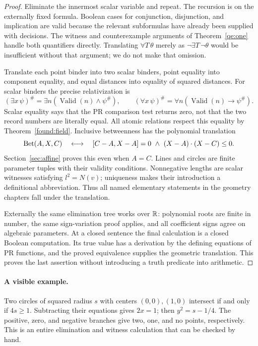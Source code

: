 \begin{proof}
Eliminate the innermost scalar variable and repeat. The recursion is on
the externally fixed formula. Boolean cases for conjunction, disjunction,
and implication are valid because the relevant subformulas have already
been supplied with decisions. The witness and counterexample arguments
of Theorem~\ref{qe:one} handle both quantifiers directly. Translating
$\forall T\,\theta$ merely as $\neg\exists T\,\neg\theta$ would
be insufficient without that argument; we do not make that omission.

Translate each point binder into two scalar binders, point equality into
component equality, and equal distances into equality of squared distances.
For scalar binders the precise relativization is
\[
 (\exists x\,\psi)^\#=\exists n(\operatorname{Valid}(n)\land\psi^\#),
 \qquad
 (\forall x\,\psi)^\#=\forall n(\operatorname{Valid}(n)\to\psi^\#).
\]
Scalar equality says that the PR comparison test returns zero, not that
the two record numbers are literally equal. All atomic relations respect
this equality by Theorem~\ref{found:field}.
Inclusive betweenness has the polynomial translation
\begin{equation}\label{eq:betweenpoly}
 \operatorname{Bet}(A,X,C)\quad\longleftrightarrow\quad
 [C-A,X-A]=0\ \land\ (X-A)\mathbin\cdot(X-C)\le0.
\end{equation}
Section~\ref{sec:affine} proves this even when $A=C$. Lines and circles
are finite parameter tuples with their validity conditions. Nonnegative
lengths are scalar witnesses satisfying $l^2=N(v)$; uniqueness makes
their introduction a definitional abbreviation. Thus all named elementary
statements in the geometry chapters fall under the translation.

Externally the same elimination tree works over $\mathbb R$: polynomial roots
are finite in number, the same sign-variation proof applies, and all
coefficient signs agree on algebraic parameters. At a closed sentence
the final calculation is a closed Boolean computation. Its true value
has a derivation by the defining equations of PR functions, and the
proved equivalence supplies the geometric translation. This proves the
last assertion without introducing a truth predicate into arithmetic.
\end{proof}

\paragraph{A visible example.}
Two circles of squared radius $s$ with centers $(0,0),(1,0)$ intersect
if and only if $4s\ge1$. Subtracting their equations gives $2x=1$;
then $y^2=s-1/4$. The positive, zero, and negative branches give two,
one, and no points, respectively. This is an entire elimination and
witness calculation that can be checked by hand.

